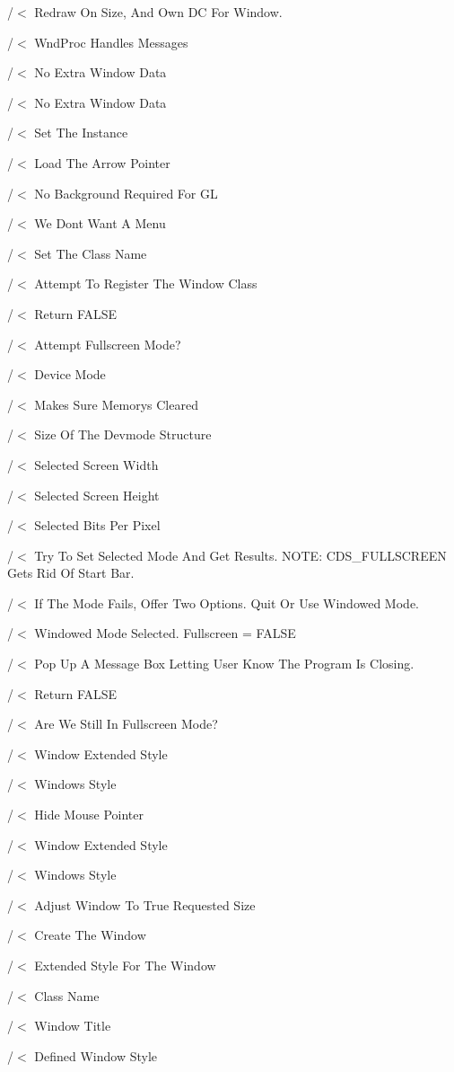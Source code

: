 /$<$ Redraw On Size, And Own DC For Window.

/$<$ Wnd\+Proc Handles Messages

/$<$ No Extra Window Data

/$<$ No Extra Window Data

/$<$ Set The Instance

/$<$ Load The Arrow Pointer

/$<$ No Background Required For GL

/$<$ We Don\textquotesingle{}t Want A Menu

/$<$ Set The Class Name

/$<$ Attempt To Register The Window Class

/$<$ Return F\+A\+L\+SE

/$<$ Attempt Fullscreen Mode?

/$<$ Device Mode

/$<$ Makes Sure Memory\textquotesingle{}s Cleared

/$<$ Size Of The Devmode Structure

/$<$ Selected Screen Width

/$<$ Selected Screen Height

/$<$ Selected Bits Per Pixel

/$<$ Try To Set Selected Mode And Get Results. N\+O\+TE\+: C\+D\+S\+\_\+\+F\+U\+L\+L\+S\+C\+R\+E\+EN Gets Rid Of Start Bar.

/$<$ If The Mode Fails, Offer Two Options. Quit Or Use Windowed Mode.

/$<$ Windowed Mode Selected. Fullscreen = F\+A\+L\+SE

/$<$ Pop Up A Message Box Letting User Know The Program Is Closing.

/$<$ Return F\+A\+L\+SE

/$<$ Are We Still In Fullscreen Mode?

/$<$ Window Extended Style

/$<$ Windows Style

/$<$ Hide Mouse Pointer

/$<$ Window Extended Style

/$<$ Windows Style

/$<$ Adjust Window To True Requested Size

/$<$ Create The Window

/$<$ Extended Style For The Window

/$<$ Class Name

/$<$ Window Title

/$<$ Defined Window Style

